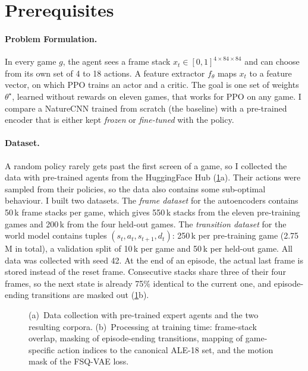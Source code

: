 \documentclass[runningheads]{llncs}
\begin{document}
\section{Prerequisites}
\label{sec:prereq}

\paragraph{Problem Formulation.} In every game $g$, the agent sees a frame stack
$x_t\in[0,1]^{4\times84\times84}$ and can choose from its own set of 4 to 18 actions. A feature
extractor $f_\theta$ maps $x_t$ to a feature vector, on which PPO trains an actor and a critic.
The goal is one set of weights $\theta^\star$, learned without rewards on eleven games, that
works for PPO on any game. I compare a NatureCNN trained from scratch (the baseline) with a
pre-trained encoder that is either kept \emph{frozen} or \emph{fine-tuned} with the policy.

\paragraph{Dataset.} A random policy rarely gets past the first screen of a game, so I
collected the data with pre-trained agents from the HuggingFace Hub (\cref{fig:data}a). Their actions were sampled from their policies, so the data also contains some sub-optimal
behaviour. I built two datasets. The \emph{frame dataset} for the
autoencoders contains 50\,k frame stacks per game, which gives 550\,k stacks from the eleven
pre-training games and 200\,k from the four held-out games. The \emph{transition dataset} for
the world model contains tuples $(s_t,a_t,s_{t+1},d_t)$: 250\,k per pre-training game (2.75\,M in
total), a validation split of 10\,k per game and 50\,k per held-out game. All data was
collected with seed 42. At the end of an episode, the actual last frame is stored instead of the reset frame.
Consecutive stacks share three of their four frames, so the next state is already 75\%
identical to the current one, and episode-ending transitions are masked out (\cref{fig:data}b).

\begin{figure}[!htbp]
\centering

\caption{(a)~Data collection with pre-trained expert agents and the two resulting corpora.
(b)~Processing at training time: frame-stack overlap, masking of episode-ending
transitions, mapping of game-specific action indices to the canonical ALE-18 set, and the
motion mask of the FSQ-VAE loss.}
\label{fig:data}
\end{figure}
\end{document}
